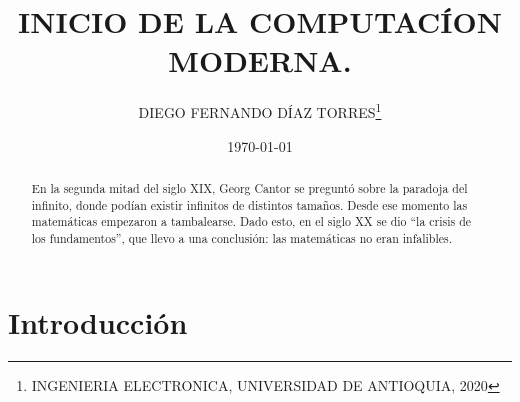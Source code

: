 \documentclass[11pt,letterpaper]{article}
\author{DIEGO FERNANDO DÍAZ TORRES\thanks{INGENIERIA ELECTRONICA, UNIVERSIDAD DE ANTIOQUIA, 2020}}
\title{INICIO DE LA COMPUTACÍON MODERNA.}
\date{\today}
\begin{document}
\maketitle





\begin{abstract}
En la segunda mitad del siglo XIX, Georg Cantor se preguntó sobre la paradoja del infinito, donde podían existir infinitos de distintos tamaños. Desde ese momento las matemáticas empezaron a tambalearse. Dado esto, en el siglo XX se dio “la crisis de los fundamentos”, que llevo a una conclusión: las matemáticas no eran infalibles.  
\end{abstract}





\section*{Introducción} %
\end{document}
